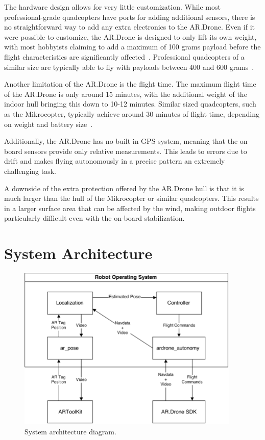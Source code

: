         The hardware design allows for very little customization. While most professional-grade quadcopters have ports for adding additional sensors, there is no straightforward way to add any extra electronics to the AR.Drone. Even if it were possible to customize, the AR.Drone is designed to only lift its own weight, with most hobbyists claiming to add a maximum of 100 grams payload before the flight characteristics are significantly affected~\cite{Forums}. Professional quadcopters of a similar size are typically able to fly with payloads between 400 and 600 grams~\cite{Mikrocopter}.

        Another limitation of the AR.Drone is the flight time. The maximum flight time of the AR.Drone is only around 15 minutes, with the additional weight of the indoor hull bringing this down to 10-12 minutes. Similar sized quadcopters, such as the Mikrocopter, typically achieve around 30 minutes of flight time, depending on weight and battery size~\cite{Mikrocopter}.

        Additionally, the AR.Drone has no built in GPS system, meaning that the on-board sensors provide only relative measurements. This leads to errors due to drift and makes flying autonomously in a precise pattern an extremely challenging task.

        A downside of the extra protection offered by the AR.Drone hull is that it is much larger than the hull of the Mikrocopter or similar quadcopters. This results in a larger surface area that can be affected by the wind, making outdoor flights particularly difficult even with the on-board stabilization. 

\section{System Architecture}

    \begin{figure}[ht]
            \centering
            \includegraphics[width=400px]{../images/system.png}
            \caption{System architecture diagram.}\label{fig:system}
    \end{figure}

